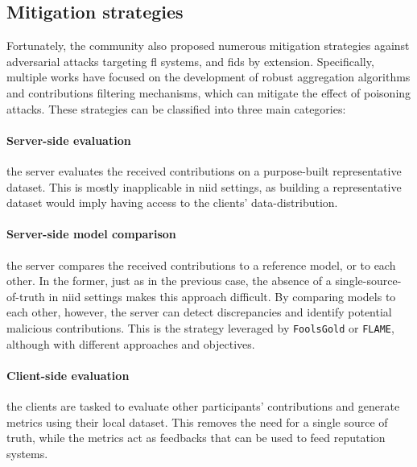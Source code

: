 \documentclass[conference]{IEEEtran}
\begin{document}



\subsection{Mitigation strategies}

Fortunately, the community also proposed numerous mitigation strategies against adversarial attacks targeting \gls{fl} systems, and \gls{fids} by extension.
Specifically, multiple works have focused on the development of robust aggregation algorithms and contributions filtering mechanisms, which can mitigate the effect of poisoning attacks.
These strategies can be classified into three main categories:

\paragraph*{Server-side evaluation} the server evaluates the received contributions on a purpose-built representative dataset.
This is mostly inapplicable in \gls{niid} settings, as building a representative dataset would imply having access to the clients' data-distribution.
    
\paragraph*{Server-side model comparison} the server compares the received contributions to a reference model, or to each other.
In the former, just as in the previous case, the absence of a single-source-of-truth in \gls{niid} settings makes this approach difficult.
By comparing models to each other, however, the server can detect discrepancies and identify potential malicious contributions.
This is the strategy leveraged by \texttt{FoolsGold} or \texttt{FLAME}, although with different approaches and objectives.

\paragraph*{Client-side evaluation} the clients are tasked to evaluate other participants' contributions and generate metrics using their local dataset.
This removes the need for a single source of truth, while the metrics act as feedbacks that can be used to feed reputation systems.
\end{document}
